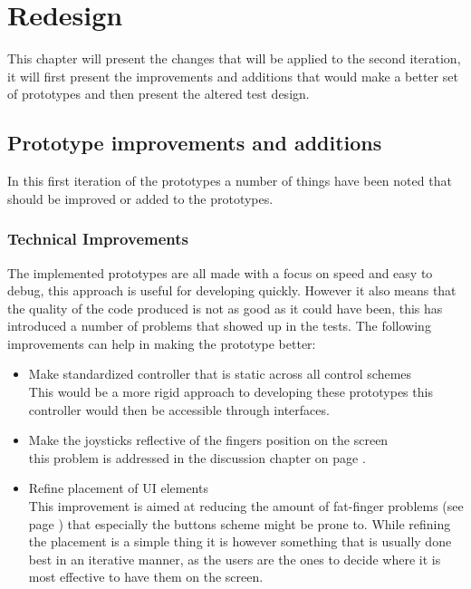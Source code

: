 \chapter {Redesign}
This chapter will present the changes that will be applied to the second iteration, it will first present the improvements and additions that would make a better set of prototypes and then present the altered test design.

\section{Prototype improvements and additions}
In this first iteration of the prototypes a number of things have been noted that should be improved or added to the prototypes. 
\subsection{Technical Improvements}
The implemented prototypes are all made with a focus on speed and easy to debug, this approach is useful for developing quickly. However it also means that the quality of the code produced is not as good as it could have been, this has introduced a number of problems that showed up in the tests. The following improvements can help in making the prototype better:

\begin{itemize}

\item Make standardized controller that is static across all control schemes\\
This would be a more rigid approach to developing these prototypes this controller would then be accessible through interfaces.

\item Make the joysticks reflective of the fingers position on the screen\\
this problem is addressed in the discussion chapter on page \pageref{DISJoystick}. 


\item Refine placement of UI elements\\ 
This improvement is aimed at reducing the amount of fat-finger problems (see page \pageref{FatFP}) that especially the buttons scheme might be prone to. While refining the placement is a simple thing it is however something that is usually done best in an iterative manner, as the users are the ones to decide where it is most effective to have them on the screen.
\end{itemize}


